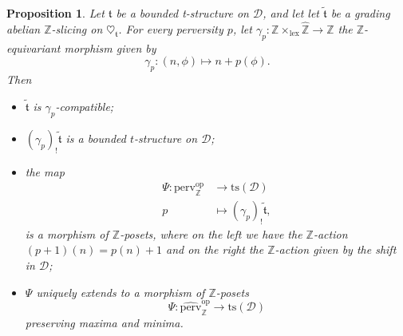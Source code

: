 \documentclass{article}
\newtheorem{prop}[thm]{Proposition}
\theoremstyle{definition}
\newcommand{\Z}{\mathbb{Z}}
\newcommand{\ts}{\mathrm{ts}}
\newcommand{\tee}{\mathfrak{t}}
\begin{document}
\begin{prop}\label{grad2}
Let $\mathfrak{t}$ be a bounded t-structure on $\mathscr{D}$, and let let $\tilde{\tee}$ be a grading abelian $\mathbb{Z}$-slicing on $\heartsuit_{\mathfrak{t}}$. For every perversity $p$, 
let $\gamma_p\colon \Z\times_{\mathrm{lex}}\hat{\Z}\to \Z$ the $\Z$-equivariant morphism given by 
\[
\gamma_p\colon (n,\phi)\mapsto n+p(\phi).
\]
Then
\begin{itemize}
\item $\tilde{\tee}$ is $\gamma_p$-compatible;
\item $ (\gamma_p)_!\tilde{\tee}$ is a bounded $t$-structure on $\mathscr{D}$;
\item the map
\begin{align*}
\Psi\colon \mathrm{perv}_\Z^{\mathrm{op}}&\to \ts(\mathscr{D})\\
p&\mapsto (\gamma_p)_!\tilde{\tee},
\end{align*}
is a morphism of $\Z$-posets, where on the left we have the $\Z$-action $(p+1)(n)=p(n)+1$ and on the right the $\Z$-action given by the shift in $\mathscr{D}$;
\item 
$\Psi$ uniquely extends to a morphism of $\Z$-posets
\[
\Psi\colon \widehat{\mathrm{perv}}_\Z^{\mathrm{op}}\to \ts(\mathscr{D})
\]
preserving maxima and minima.
\end{itemize}
\end{prop}
\end{document}
